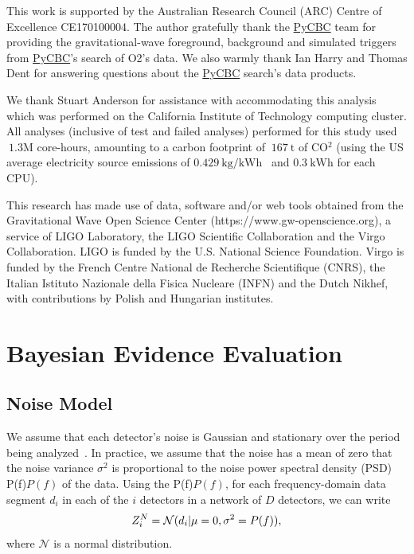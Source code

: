 \documentclass[%
 nofootinbib,
 amsmath,amssymb,
 aps,
 twocolumn,
 superscriptaddress
]{revtex4-2}
\newcommand{\pycbc}{{\sc \href{https://pycbc.org/}{{PyCBC}}}\xspace}
\newcommand{\mathcmd}[1]{{\sc \relax\ifmmode#1\else $#1$\fi}\xspace}
\newcommand{\psd}{\mathcmd{P(f)}}
\begin{document}
\begin{acknowledgments}
This work is supported by the Australian Research Council (ARC) Centre of Excellence CE170100004.
The author gratefully thank the \pycbc team for providing the gravitational-wave foreground, background and simulated triggers from \pycbc's search of O2's data. We also warmly thank Ian Harry and Thomas Dent for answering questions about the \pycbc search's data products.  

We thank Stuart Anderson for assistance with accommodating this analysis which was performed on the California Institute of Technology computing cluster. All analyses (inclusive of test and failed analyses) performed for this study used $~1.3\mathrm{M}$ core-hours, amounting to a carbon footprint of $~167\ \mathrm{t}$ of CO$^2$ (using the US average electricity source emissions of $0.429\ \text{kg/kWh}$~\cite{greenhouse} and $0.3\ \text{kWh}$ for each CPU).

This research has made use of data, software and/or web tools obtained from the Gravitational Wave Open Science Center (https://www.gw-openscience.org), a service of LIGO Laboratory, the LIGO Scientific Collaboration and the Virgo Collaboration. LIGO is funded by the U.S. National Science Foundation. Virgo is funded by the French Centre National de Recherche Scientifique (CNRS), the Italian Istituto Nazionale della Fisica Nucleare (INFN) and the Dutch Nikhef, with contributions by Polish and Hungarian institutes.


\end{acknowledgments}

\appendix



\section{Bayesian Evidence Evaluation}\label{sec:bayesianEvidEval}
\subsection{Noise Model}
We assume that each detector's noise is Gaussian and stationary over the period being analyzed~\cite{ligo_psd}. In practice, we assume that the noise has a mean of zero that the noise variance $\sigma^2$ is proportional to the noise power spectral density (PSD) \psd of the data. Using the \psd, for each frequency-domain data segment $d_i$ in each of the $i$ detectors in a network of $D$ detectors, we can write 
\begin{equation}
\label{eq:zn}
Z^N_i = \mathcal{N}(d_i|\mu=0,\sigma^2=\psd),
\end{equation}
where $\mathcal{N}$ is a normal distribution. 
\end{document}
